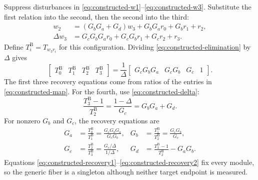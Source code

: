 \documentclass[11pt,a4paper]{article}
\begin{document}
Suppress disturbances in \eqref{eq:constructed-w1}--\eqref{eq:constructed-w3}.  Substitute the first relation into the second, then the second into the third:
\begin{align}
  w_2&=(G_bG_a+G_d)w_3+G_bG_ar_0+G_br_1+r_2,\\
  \Delta w_3&=G_cG_bG_ar_0+G_cG_br_1+G_cr_2+r_3.
  \label{eq:constructed-elimination}
\end{align}
Define $T^{\mathrm B}_i=T_{w_3r_i}$ for this configuration.  Dividing \eqref{eq:constructed-elimination} by $\Delta$ gives
\begin{equation}
  \begin{bmatrix}T^{\mathrm B}_0&T^{\mathrm B}_1&T^{\mathrm B}_2&T^{\mathrm B}_3\end{bmatrix}
  =\frac{1}{\Delta}
   \begin{bmatrix}G_cG_bG_a&G_cG_b&G_c&1\end{bmatrix}.
  \label{eq:constructed-map}
\end{equation}
The first three recovery equations come from ratios of the entries in \eqref{eq:constructed-map}.  For the fourth, use \eqref{eq:constructed-delta}:
\[
  \frac{T^{\mathrm B}_3-1}{T^{\mathrm B}_2}
  =\frac{1-\Delta}{G_c}=G_bG_a+G_d.
\]
For nonzero $G_b$ and $G_c$, the recovery equations are
\begin{align}
  G_a&=\frac{T^{\mathrm B}_0}{T^{\mathrm B}_1}
      =\frac{G_cG_bG_a}{G_cG_b},
  &G_b&=\frac{T^{\mathrm B}_1}{T^{\mathrm B}_2}
      =\frac{G_cG_b}{G_c},
  \label{eq:constructed-recovery1}\\
  G_c&=\frac{T^{\mathrm B}_2}{T^{\mathrm B}_3}
      =\frac{G_c/\Delta}{1/\Delta},
  &G_d&=\frac{T^{\mathrm B}_3-1}{T^{\mathrm B}_2}-G_aG_b.
  \label{eq:constructed-recovery2}
\end{align}
Equations \eqref{eq:constructed-recovery1}--\eqref{eq:constructed-recovery2} fix every module, so the generic fiber is a singleton although neither target endpoint is measured.
\end{document}
